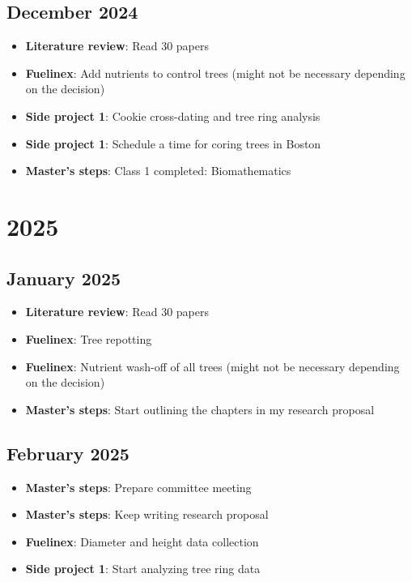 \documentclass{article}
\begin{document}
\subsection*{December 2024}
\begin{itemize}
    \item \textbf{Literature review}: Read 30 papers 
    \item \textbf{Fuelinex}: Add nutrients to control trees (might not be necessary depending on the decision)
    \item \textbf{Side project 1}: Cookie cross-dating and tree ring analysis
    \item \textbf{Side project 1}: Schedule a time for coring trees in Boston
    \item \textbf{Master's steps}: Class 1 completed: Biomathematics
\end{itemize}

\section*{\centering \Large 2025}

\subsection*{January 2025}
\begin{itemize}
    \item \textbf{Literature review}: Read 30 papers
    \item \textbf{Fuelinex}: Tree repotting
    \item \textbf{Fuelinex}: Nutrient wash-off of all trees (might not be necessary depending on the decision)
    \item \textbf{Master's steps}: Start outlining the chapters in my research proposal
\end{itemize}

\subsection*{February 2025}
\begin{itemize}
    \item \textbf{Master's steps}: Prepare committee meeting
    \item \textbf{Master's steps}: Keep writing research proposal
    \item \textbf{Fuelinex}: Diameter and height data collection
    \item \textbf{Side project 1}: Start analyzing tree ring data
\end{itemize}
\end{document}
